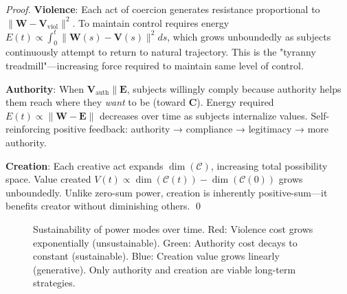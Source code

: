 \documentclass[11pt,a4paper]{article}
\theoremstyle{definition}
\theoremstyle{remark}
\newcommand{\CC}{\mathcal{C}}
\newcommand{\EE}{\mathbf{E}}
\newcommand{\WW}{\mathbf{W}}
\newcommand{\VV}{\mathbf{V}}
\begin{document}
\begin{enumerate}
\begin{proof}
\textbf{Violence}: Each act of coercion generates resistance proportional to \(\|\WW - \VV_{\text{viol}}\|^2\). To maintain control requires energy \(E(t) \propto \int_0^t \|\WW(s) - \VV(s)\|^2 ds\), which grows unboundedly as subjects continuously attempt to return to natural trajectory. This is the "tyranny treadmill"—increasing force required to maintain same level of control.

\textbf{Authority}: When \(\VV_{\text{auth}} \parallel \EE\), subjects willingly comply because authority helps them reach where they \textit{want} to be (toward \(\mathbf{C}\)). Energy required \(E(t) \propto \|\WW - \EE\|\) decreases over time as subjects internalize values. Self-reinforcing positive feedback: authority → compliance → legitimacy → more authority.

\textbf{Creation}: Each creative act expands \(\dim(\CC)\), increasing total possibility space. Value created \(V(t) \propto \dim(\CC(t)) - \dim(\CC(0))\) grows unboundedly. Unlike zero-sum power, creation is inherently positive-sum—it benefits creator without diminishing others. \qed
\end{proof}

\begin{figure}[H]
\centering
{}
\caption{Sustainability of power modes over time. Red: Violence cost grows exponentially (unsustainable). Green: Authority cost decays to constant (sustainable). Blue: Creation value grows linearly (generative). Only authority and creation are viable long-term strategies.}
\label{fig:power_sustainability}
\end{figure}


\end{enumerate}
\end{document}
